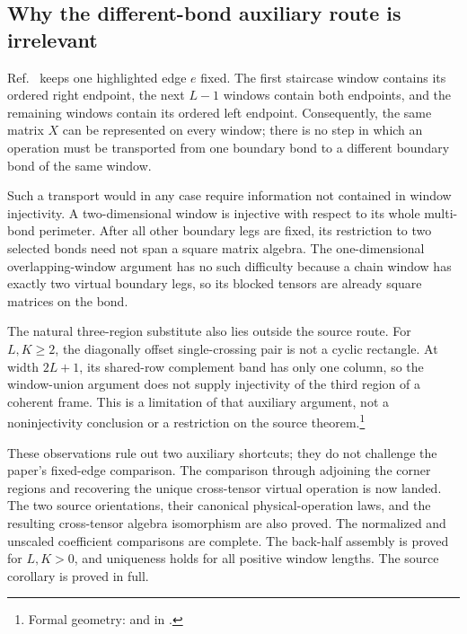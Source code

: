 \documentclass{article}
\begin{document}
\subsection{Why the different-bond auxiliary route is irrelevant}

Ref.~\cite{Molnar2018NormalPEPS} keeps one highlighted edge $e$ fixed.  The first staircase window
contains its ordered right endpoint, the next $L-1$ windows contain both
endpoints, and the remaining windows contain its ordered left endpoint.
Consequently, the same matrix $X$ can be represented on every window; there
is no step in which an operation must be transported from one boundary bond
to a different boundary bond of the same window.

Such a transport would in any case require information not contained in
window injectivity.  A two-dimensional window is injective with respect to
its whole multi-bond perimeter.  After all other boundary legs are fixed, its
restriction to two selected bonds need not span a square matrix algebra.  The
one-dimensional overlapping-window argument has no such difficulty because
a chain window has exactly two virtual boundary legs, so its blocked tensors
are already square matrices on the bond.

The natural three-region substitute also lies outside the source route.
For $L,K\geq2$, the diagonally offset single-crossing pair is not a cyclic
rectangle. At width $2L+1$, its shared-row complement band has only one
column, so the window-union argument does not supply injectivity of the
third region of a coherent frame. This is a limitation of that auxiliary
argument, not a noninjectivity conclusion or a restriction on the source
theorem.\footnote{Formal geometry:
     and
    in .}

These observations rule out two auxiliary shortcuts; they do not challenge
the paper's fixed-edge comparison.  The comparison through adjoining the
corner regions and recovering the unique cross-tensor virtual operation is now
landed.  The two source orientations, their canonical physical-operation laws,
and the resulting cross-tensor algebra isomorphism are also proved. The
normalized and unscaled coefficient comparisons are complete. The
back-half assembly is proved for $L,K>0$, and uniqueness holds for all
positive window lengths. The source corollary is proved in full.



\end{document}
